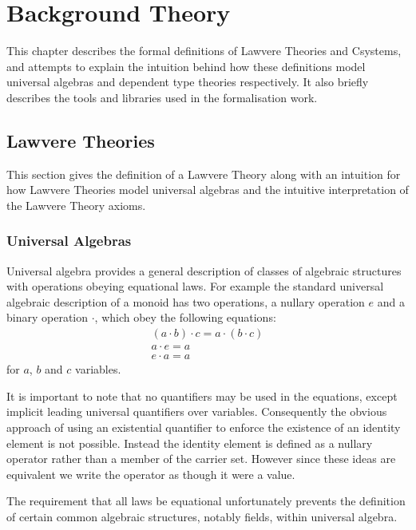 \chapter{Background Theory}
This chapter describes the formal definitions of Lawvere Theories\cite{Lawvere}
and Csystems\cite{cartmellcsystems1}\cite{cartmellcsystems2}, and attempts to
explain the intuition behind how these definitions model universal algebras and
dependent type theories respectively. It also briefly describes the tools and
libraries used in the formalisation work.

\section{Lawvere Theories}
This section gives the definition of a Lawvere Theory along with an intuition
for how Lawvere Theories model universal algebras and the intuitive
interpretation of the Lawvere Theory axioms. 

\subsection{Universal Algebras}
Universal algebra\cite{universalalgebra} provides a general description of
classes of algebraic structures with operations obeying equational laws. For
example the standard universal algebraic description of a monoid has two
operations, a nullary operation $e$ and a binary operation $\cdot$, which obey
the following equations:
\begin{gather*}
    (a\cdot b)\cdot c = a\cdot (b\cdot c) \\
    a \cdot e = a \\
    e \cdot a = a
\end{gather*}
for $a$, $b$ and $c$ variables.

It is important to note that no quantifiers may be used in the equations, except
implicit leading universal quantifiers over variables. Consequently the obvious
approach of using an existential quantifier to enforce the existence of an
identity element is not possible. Instead the identity element is defined as a
nullary operator rather than a member of the carrier set. However since these
ideas are equivalent we write the operator as though it were a value.

The requirement that all laws be equational unfortunately prevents the
definition of certain common algebraic structures, notably fields, within
universal algebra.

